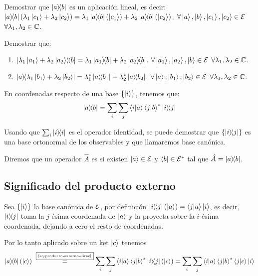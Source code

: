 \begin{exercise}
	Demostrar que $\ketbra{a}{b}$ es un aplicación lineal, es decir:
	$\ketbra{a}{b}(\lambda_1\ket{c_1}+\lambda_2\ket{c_2})=\lambda_1\ketbra{a}{b}(\ket{c_1})+\lambda_2\ketbra{a}{b}(\ket{c_2})$. $\forall \ket{a}, \ket{b}, \ket{c_1}, \ket{c_2}\in\mathcal{E}$ $\forall\lambda_1,\lambda_2\in\mathbb{C}$.
\end{exercise}
\begin{exercise}
	Demostrar que:
	\begin{enumerate}
		\item $\ketbra{\lambda_1\ket{a_1}+\lambda_2\ket{a_2}}{b}=\lambda_1\ketbra{a_1}{b}+\lambda_2\ketbra{a_2}{b}$. $\forall \ket{a_1}, \ket{a_2}, \ket{b}\in\mathcal{E}$ $\forall\lambda_1,\lambda_2\in\mathbb{C}$.
		\item $\ketbra{a}{\lambda_1\ket{b_1}+\lambda_2\ket{b_2}}=\lambda_1^*\ketbra{a}{b_1}+\lambda_2^*\ketbra{a}{b_2}$. $\forall \ket{a}, \ket{b_1}, \ket{b_2}\in\mathcal{E}$ $\forall\lambda_1,\lambda_2\in\mathbb{C}$.
	\end{enumerate}
\end{exercise}
En coordenadas respecto de una base $\qty{\ket{i}}$, tenemos que:
\begin{equation}
	\label{eq:producto-externo-dirac}
	\ketbra{a}{b} = \sum_{i}\sum_{j}\braket{i}{a}\braket{j}{b}^*\ketbra{i}{j}
\end{equation}

Usando que $\sum_i \ketbra{i}{i}$ es el operador identidad, se puede demostrar que $\qty{\ketbra{i}{j}}$ es una base ortonormal de los observables y que llamaremos base canónica.

\begin{definition}
	Diremos que un operador $\hat{A}$ es  si existen $\ket{a}\in\mathcal{E}$ y $\bra{b}\in\mathcal{E}^*$ tal que $\hat{A}=\ketbra{a}{b}$.
\end{definition}

\subsection{Significado del producto externo}\label{subsec:significado-del-producto-externo}

Sea $\qty{\ket{i}}$ la base canónica de $\mathcal{E}$, por definición $\ketbra{i}{j}\left(\ket{a}\right)=\braket{j}{a}\ket{i}$, es decir, $\ketbra{i}{j}$ toma la $j$-ésima coordenada de $\ket{a}$ y la proyecta sobre la $i$-ésima coordenada, dejando a cero el resto de coordenadas.

Por lo tanto aplicado sobre un ket $\ket{c}$ tenemos
\begin{equation}
	\label{eq:producto-externo-ket-coordenadas}
	\ketbra{a}{b}\left( \ket{c} \right)~\overset{\fbox{\tiny \ref{eq:producto-externo-dirac}}}{=} \sum_{i}\sum_{j}\braket{i}{a}\braket{j}{b}^*\ketbra{i}{j}\left( \ket{c} \right)=\sum_{i}\sum_{j}\braket{i}{a}\braket{j}{b}^*\braket{j}{c}\ket{i}
\end{equation}

